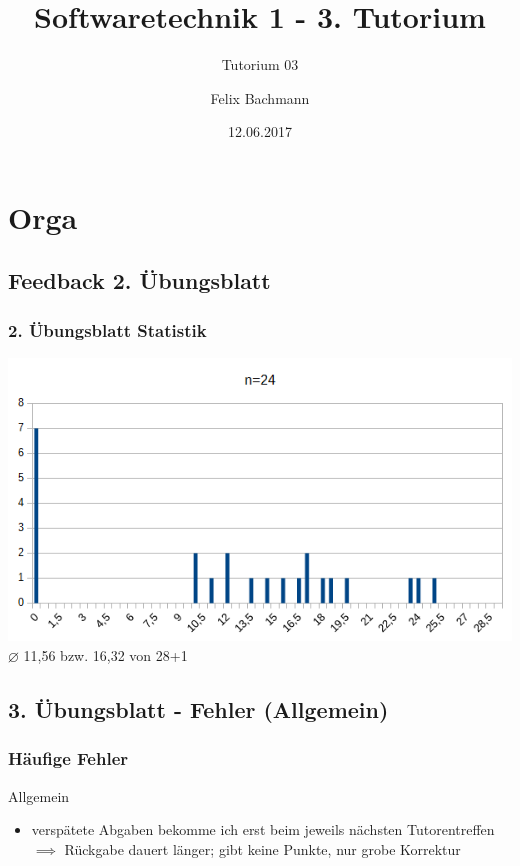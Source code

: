 \documentclass[18pt]{beamer}
\title[SWT1]{Softwaretechnik 1 - 3. Tutorium}
\subtitle{Tutorium 03}
\author{Felix Bachmann}
\date{12.06.2017}
\institute{KIT - Institut für Programmstrukturen und Datenorganisation (IPD)}
\begin{document}

\begin{frame}
\titlepage
\end{frame}

\begin{frame}
\tableofcontents
\end{frame}


\section{Orga}
	\subsection{Feedback 2. Übungsblatt}
	\begin{frame}
		\frametitle{2. Übungsblatt Statistik}
		\includegraphics[scale=0.7]{./pics/tut3/statistics-ub3.png}
		\linebreak \centering $\diameter$ 11,56 bzw. 16,32 von 28+1
	\end{frame}
	
	\subsection{3. Übungsblatt - Fehler (Allgemein)}
	\begin{frame}
		\frametitle{Häufige Fehler}
		\begin{block}{Allgemein}
			\begin{itemize}
				\item verspätete Abgaben bekomme ich erst beim jeweils nächsten Tutorentreffen	
				\linebreak $\implies$ Rückgabe dauert länger; gibt keine Punkte, nur grobe Korrektur
			\end{itemize}
		\end{block}
	\end{frame}
	
\end{document}
